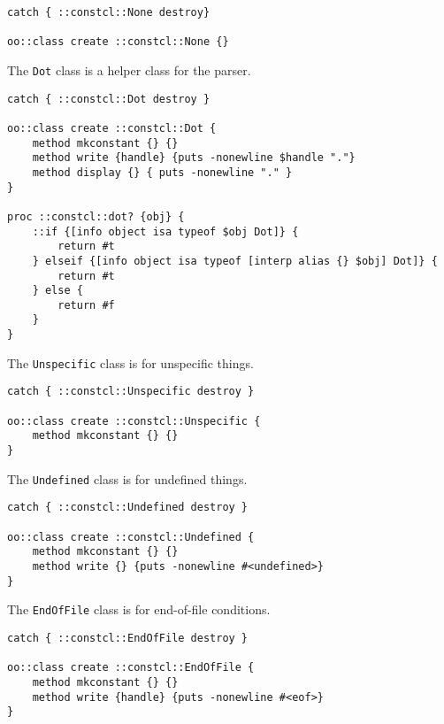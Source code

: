 \documentclass{report}
\begin{document}
\noindent\makebox[\linewidth]{\rule{\linewidth}{0.4pt}}
\begin{lstlisting}
catch { ::constcl::None destroy}
 
oo::class create ::constcl::None {}
\end{lstlisting}
\noindent\makebox[\linewidth]{\rule{\linewidth}{0.4pt}}

The \texttt{Dot} class is a helper class for the parser.

\noindent\makebox[\linewidth]{\rule{\linewidth}{0.4pt}}
\begin{lstlisting}
catch { ::constcl::Dot destroy }
 
oo::class create ::constcl::Dot {
    method mkconstant {} {}
    method write {handle} {puts -nonewline $handle "."}
    method display {} { puts -nonewline "." }
}
 
proc ::constcl::dot? {obj} {
    ::if {[info object isa typeof $obj Dot]} {
        return #t
    } elseif {[info object isa typeof [interp alias {} $obj] Dot]} {
        return #t
    } else {
        return #f
    }
}
\end{lstlisting}
\noindent\makebox[\linewidth]{\rule{\linewidth}{0.4pt}}

The \texttt{Unspecific} class is for unspecific things.

\noindent\makebox[\linewidth]{\rule{\linewidth}{0.4pt}}
\begin{lstlisting}
catch { ::constcl::Unspecific destroy }
 
oo::class create ::constcl::Unspecific {
    method mkconstant {} {}
}
\end{lstlisting}
\noindent\makebox[\linewidth]{\rule{\linewidth}{0.4pt}}

The \texttt{Undefined} class is for undefined things.

\noindent\makebox[\linewidth]{\rule{\linewidth}{0.4pt}}
\begin{lstlisting}
catch { ::constcl::Undefined destroy }
 
oo::class create ::constcl::Undefined {
    method mkconstant {} {}
    method write {} {puts -nonewline #<undefined>}
}
\end{lstlisting}
\noindent\makebox[\linewidth]{\rule{\linewidth}{0.4pt}}

The \texttt{EndOfFile} class is for end-of-file conditions.

\noindent\makebox[\linewidth]{\rule{\linewidth}{0.4pt}}
\begin{lstlisting}
catch { ::constcl::EndOfFile destroy }
 
oo::class create ::constcl::EndOfFile {
    method mkconstant {} {}
    method write {handle} {puts -nonewline #<eof>}
}
\end{lstlisting}
\noindent\makebox[\linewidth]{\rule{\linewidth}{0.4pt}}
\end{document}
